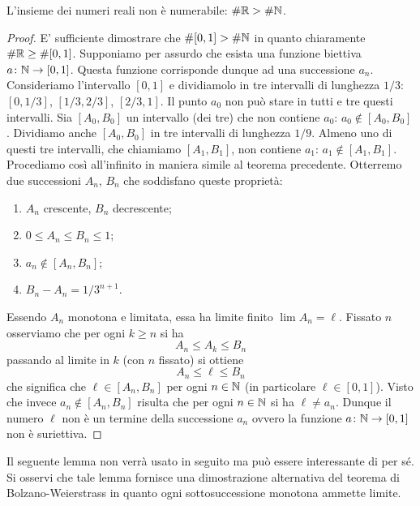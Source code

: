 \begin{theorem}
\label{th:cantor_secondo}%
%
%
%
%
L'insieme dei numeri reali non è numerabile: $\#\mathbb R > \#\mathbb N$.
\end{theorem}
%
\begin{proof}
E' sufficiente dimostrare che $\#[0,1] > \#\mathbb N$ in quanto
chiaramente $\#\mathbb R \ge \#[0,1]$.
Supponiamo per assurdo che esista una funzione biettiva $a\colon \mathbb N \to [0,1]$.
Questa funzione corrisponde dunque ad una successione $a_n$.
Consideriamo l'intervallo $[0,1]$ e dividiamolo in tre intervalli  di lunghezza $1/3$: $[0,1/3]$, $[1/3,2/3]$, $[2/3,1]$. Il punto $a_0$ non può stare in tutti e tre questi intervalli. Sia $[A_0,B_0]$ un intervallo (dei tre) che non contiene $a_0$: $a_0 \not \in [A_0,B_0]$.
Dividiamo anche $[A_0,B_0]$ in tre intervalli di lunghezza $1/9$.
Almeno uno di questi tre intervalli, che chiamiamo $[A_1,B_1]$,
non contiene $a_1$: $a_1 \not \in [A_1,B_1]$.
Procediamo così all'infinito in maniera simile al teorema precedente.
Otterremo due successioni $A_n$, $B_n$ che soddisfano queste proprietà:
\begin{enumerate}
\item $A_n$ crescente, $B_n$ decrescente;
\item $0\le A_n \le B_n \le 1$;
\item $a_n \not \in [A_n, B_n]$;
\item $B_n - A_n = 1/3^{n+1}$.
\end{enumerate}

Essendo $A_n$ monotona e limitata, essa ha limite finito $\lim A_n = \ell$.
Fissato $n$ osserviamo che per ogni $k\ge n$ si ha
\[
  A_n \le A_k \le B_n
\]
passando al limite in $k$ (con $n$ fissato) si ottiene
\[
  A_n \le \ell \le B_n
\]
che significa che $\ell \in [A_n, B_n]$ per ogni $n\in \mathbb N$
(in particolare $\ell \in [0,1]$).
Visto che invece $a_n \not \in [A_n, B_n]$ risulta che per
ogni $n\in \mathbb N$ si ha $\ell \neq a_n$.
Dunque il numero $\ell$ non è un termine della successione $a_n$
ovvero la funzione $a\colon \mathbb N \to [0,1]$ non è suriettiva.
\end{proof}

Il seguente lemma
non verrà usato in seguito ma può essere interessante di per sé.
Si osservi che tale lemma fornisce una dimostrazione alternativa
del teorema di Bolzano-Weierstrass in quanto ogni sottosuccessione monotona
ammette limite.

